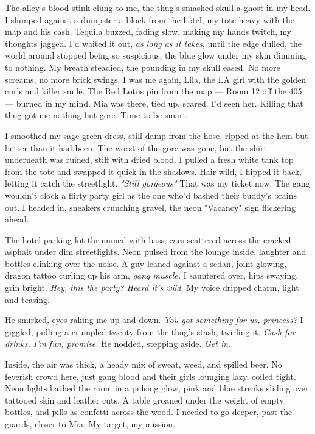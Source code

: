 \documentclass[12pt,oneside]{book}
\begin{document}
The alley’s blood-stink clung to me, the thug’s smashed skull a ghost in my head. I slumped against a dumpster a block from the hotel, my tote heavy with the map and his cash. Tequila buzzed, fading slow, making my hands twitch, my thoughts jagged. I’d waited it out, \textit{as long as it takes}, until the edge dulled, the world around stopped being so suspicious, the blue glow under my skin dimming to nothing. My breath steadied, the pounding in my skull eased. No more screams, no more brick swings. I was me again, Lila, the LA girl with the golden curls and killer smile. The Red Lotus pin from the map — Room 12 off the 405 — burned in my mind. Mia was there, tied up, scared. I’d seen her. Killing that thug got me nothing but gore. Time to be smart.

I smoothed my sage-green dress, still damp from the hose, ripped at the hem but better than it had been. The worst of the gore was gone, but the shirt underneath was ruined, stiff with dried blood. I pulled a fresh white tank top from the tote and swapped it quick in the shadows. Hair wild, I flipped it back, letting it catch the streetlight. \textit{"Still gorgeous"} That was my ticket now. The gang wouldn’t clock a flirty party girl as the one who’d bashed their buddy’s brains out. I headed in, sneakers crunching gravel, the neon "Vacancy" sign flickering ahead.

The hotel parking lot thrummed with bass, cars scattered across the cracked asphalt under dim streetlights. Neon pulsed from the lounge inside, laughter and bottles clinking over the noise. A guy leaned against a sedan, joint glowing, dragon tattoo curling up his arm, \textit{gang muscle.} I sauntered over, hips swaying, grin bright. \textit{Hey, this the party? Heard it’s wild}. My voice dripped charm, light and teasing.

He smirked, eyes raking me up and down. \textit{You got something for us, princess?} I giggled, pulling a crumpled twenty from the thug’s stash, twirling it. \textit{Cash for drinks. I’m fun, promise.} He nodded, stepping aside. \textit{Get in}.

Inside, the air was thick, a heady mix of sweat, weed, and spilled beer. No feverish crowd here, just gang blood and their girls lounging lazy, coiled tight. Neon lights bathed the room in a pulsing glow, pink and blue streaks sliding over tattooed skin and leather cuts. A table groaned under the weight of empty bottles, and pills as confetti across the wood. I needed to go deeper, past the guards, closer to Mia. My target, my mission.
\end{document}
